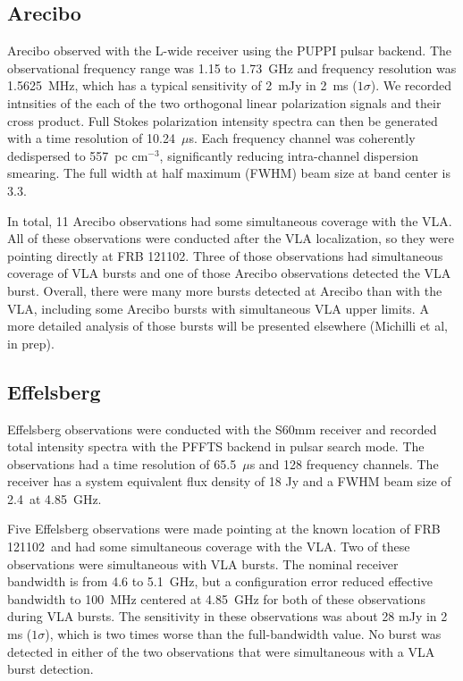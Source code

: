 \documentclass[twocolumn]{aastex61}
\newcommand{\frb}{FRB 121102}
\begin{document}
\subsection{Arecibo}

Arecibo observed with the L-wide receiver using the PUPPI pulsar backend. The observational frequency range was 1.15 to 1.73~GHz and frequency resolution was 1.5625~MHz, which has a typical sensitivity of 2~mJy in 2~ms ($1\sigma$). We recorded intnsities of the each of the two orthogonal linear polarization signals and their cross product. Full Stokes polarization intensity spectra can then be generated with a time resolution of 10.24~$\mu$s. Each frequency channel was coherently dedispersed to 557~pc cm$^{-3}$, significantly reducing intra-channel dispersion smearing. The full width at half maximum (FWHM) beam size at band center is 3.3\arcmin.

In total, 11 Arecibo observations had some simultaneous coverage with the VLA. All of these observations were conducted after the VLA localization, so they were pointing directly at \frb. Three of those observations had simultaneous coverage of VLA bursts and one of those Arecibo observations detected the VLA burst. 
Overall, there were many more bursts detected at Arecibo than with the VLA, including some Arecibo bursts with simultaneous VLA upper limits. A more detailed analysis of those bursts will be presented elsewhere (Michilli et al, in prep).

\subsection{Effelsberg}

Effelsberg observations were conducted with the S60mm receiver and recorded total intensity spectra with the PFFTS backend in pulsar search mode. The observations had a time resolution of 65.5~$\mu$s and 128 frequency channels. The receiver has a system equivalent flux density of 18 Jy and a FWHM beam size of 2.4\arcmin\ at 4.85~GHz. 

Five Effelsberg observations were made pointing at the known location of \frb\ and had some simultaneous coverage with the VLA. Two of these observations were simultaneous with VLA bursts. The nominal receiver bandwidth is from 4.6 to 5.1~GHz, but a configuration error reduced effective bandwidth to 100~MHz centered at 4.85~GHz for both of these observations during VLA bursts. The sensitivity in these observations was about 28 mJy in 2 ms ($1\sigma$), which is two times worse than the full-bandwidth value. No burst was detected in either of the two observations that were simultaneous with a VLA burst detection.
\end{document}
